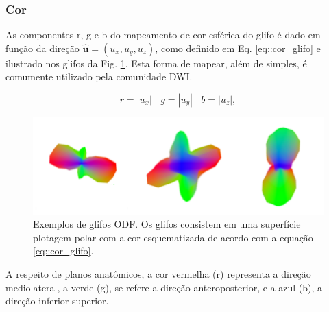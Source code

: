 \documentclass[
    12pt,                %
    oneside,            %
    a4paper,            %
    english,            %
    french,                %
    spanish,            %
    brazil                %
    ]{abntex2}
\begin{document}

\subsubsection{Cor}

As componentes r, g e b do mapeamento de cor esférica do glifo é dado em função da direção $\mathbf{\hat{u}} = (u_x, u_y, u_z)$, como definido em Eq. \ref{eq::cor_glifo} e ilustrado nos glifos da Fig. \ref{fig::glifo_ilustrado}. Esta forma de mapear, além de simples, é comumente utilizado pela comunidade DWI. %

\begin{equation}
\label{eq::cor_glifo}
    r = |u_x| ~~~~ g = |u_y| ~~~~ b = |u_z|, 
\end{equation}

\begin{figure}[ht]

    \centering
    \includegraphics[width=.8\linewidth, angle=0]{figs/Esquema_Glifo/Glifos3Ex.png}
    \caption{Exemplos de glifos ODF. Os glifos consistem em uma superfície plotagem polar com a cor esquematizada de acordo com a equação \ref{eq::cor_glifo}.}
    \label{fig::glifo_ilustrado}
   \hspace{1pt}
\end{figure}

A respeito de planos anatômicos, a cor vermelha (r) representa a direção mediolateral, a verde (g), se refere a direção anteroposterior, e a azul (b), a direção inferior-superior.
\end{document}
